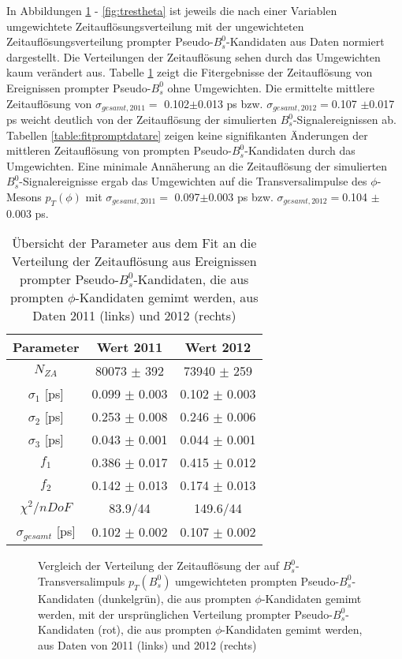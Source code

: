 \documentclass{article}
\begin{document}
In Abbildungen \ref{fig:tresbspt} - \ref{fig:trestheta} ist jeweils die nach einer Variablen umgewichtete Zeitauflösungsverteilung mit der ungewichteten Zeitauflösungsverteilung prompter Pseudo-$B_s^0$-Kandidaten aus Daten normiert dargestellt. Die Verteilungen der Zeitauflösung sehen durch das Umgewichten kaum verändert aus. Tabelle \ref{table:fitpromptdata} zeigt die Fitergebnisse der Zeitauflösung von Ereignissen prompter Pseudo-$B_s^0$ ohne Umgewichten. Die ermittelte mittlere Zeitauflösung von $\sigma_{gesamt,2011}=$ 0.102$\pm$0.013 ps bzw. $\sigma_{gesamt,2012}=$0.107 $\pm$0.017 ps weicht deutlich von der Zeitauflösung der simulierten $B_s^0$-Signalereignissen ab. Tabellen \text{\ref{table:fitpromptdatarebspt} -} \ref{table:fitpromptdatare} zeigen keine signifikanten Änderungen der mittleren Zeitauflösung von prompten Pseudo-$B_s^0$-Kandidaten durch das Umgewichten. Eine minimale Annäherung an die Zeitauflösung der simulierten $B_s^0$-Signalereignisse ergab das Umgewichten auf die Transversalimpulse des $\phi$-Mesons $p_T(\phi)$ mit $\sigma_{gesamt,2011}=$ 0.097$\pm$0.003 ps bzw. $\sigma_{gesamt,2012}=$0.104 $\pm$0.003 ps.

\begin{table}[h!]
\noindent \begin{centering}
\begin{tabular}{c|c|c}
Parameter & Wert 2011 & Wert 2012 \tabularnewline
\hline 
$N_{ZA}$ & 80073 $\pm$ 392& 73940 $\pm$ 259 \tabularnewline
$\sigma_1$ [ps] & 0.099 $\pm$ 0.003& 0.102 $\pm$ 0.003 \tabularnewline
$\sigma_2$ [ps] & 0.253 $\pm$ 0.008& 0.246 $\pm$ 0.006 \tabularnewline
$\sigma_3$ [ps] & 0.043 $\pm$ 0.001& 0.044 $\pm$ 0.001 \tabularnewline
$f_1$ & 0.386 $\pm$ 0.017 & 0.415 $\pm$ 0.012 \tabularnewline
$f_2$ & 0.142 $\pm$ 0.013& 0.174 $\pm$ 0.013\tabularnewline
\hline
$\chi^2/nDoF$ & 83.9/44 & 149.6/44\tabularnewline
\hline
$\sigma_{gesamt}$ [ps] & 0.102 $\pm$ 0.002 & 0.107 $\pm$ 0.002\tabularnewline
\end{tabular}
\par \end{centering}
\caption{Übersicht der Parameter aus dem Fit an die Verteilung der Zeitauflösung aus Ereignissen prompter Pseudo-$B_s^0$-Kandidaten, die aus prompten $\phi$-Kandidaten gemimt werden, aus Daten 2011 (links) und 2012 (rechts)}
\label{table:fitpromptdata}
\end{table}



\begin{figure}[h!]
\caption{Vergleich der Verteilung der Zeitauflösung der auf $B_s^0$-Transversalimpuls $p_T(B_s^0)$ umgewichteten prompten Pseudo-$B_s^0$-Kandidaten (dunkelgrün), die aus prompten $\phi$-Kandidaten gemimt werden, mit der ursprünglichen Verteilung prompter Pseudo-$B_s^0$-Kandidaten (rot), die aus prompten $\phi$-Kandidaten gemimt werden, aus Daten von 2011 (links) und 2012 (rechts)}
\label{fig:tresbspt}
\end{figure} 
\end{document}
